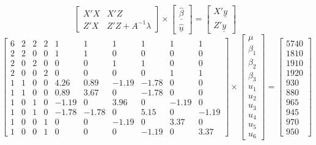 \documentclass[12pt,a4paper]{paper}
\begin{document}
\begin{enumerate}
\begin{enumerate}
\begin{equation*}
\begin{bmatrix}X'X & X'Z\\Z'X & Z'Z + A^{-1}\lambda\end{bmatrix} \times \begin{bmatrix}\underline{\hat{\beta}}\\\underline{\hat{u}}\end{bmatrix} = \begin{bmatrix}X'\underline{y}\\Z'\underline{y}\end{bmatrix}
\end{equation*}
\begin{equation*}
\begin{bmatrix}6&2&2&2&1&1&1&1&1&1\\
2&2&0&0&1&1&0&0&0&0\\
2&0&2&0&0&0&1&1&0&0\\
2&0&0&2&0&0&0&0&1&1\\
1&1&0&0&4.26&0.89&-1.19&-1.78&0&0\\
1&1&0&0&0.89&3.67&0&-1.78&0&0\\
1&0&1&0&-1.19&0&3.96&0&-1.19&0\\
1&0&1&0&-1.78&-1.78&0&5.15&0&-1.19\\
1&0&0&1&0&0&-1.19&0&3.37&0\\
1&0&0&1&0&0&0&-1.19&0&3.37\end{bmatrix} \times \begin{bmatrix}\mu\\\beta_{1}\\\beta_{2}\\\beta_{3}\\u_{1}\\u_{2}\\u_{3}\\u_{4}\\u_{5}\\u_{6}\end{bmatrix}= \begin{bmatrix}5740\\1810\\1910\\1920\\930\\880\\965\\945\\970\\950\end{bmatrix}

\end{equation*}
\end{enumerate}
\end{enumerate}
\end{document}
